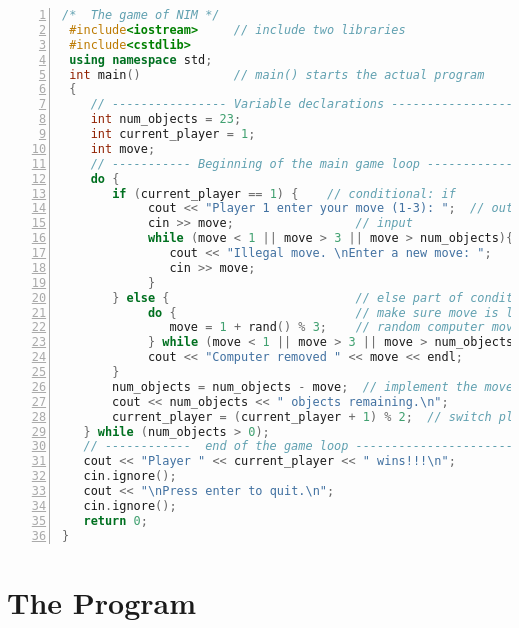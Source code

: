 \begin{minipage}{\textwidth}
\begin{lstlisting}[language=C++,numbers = left, xleftmargin=4.0ex, basicstyle=\small,emph={num_objects,move,current_player},emphstyle = \color{\mycolor},
showstringspaces=false,
caption = {The code for NIM.  When entering this program, do not enter the line numbers.  Keywords are in bold, comments are in italics, and variables are colored maroon.}]
     /*  The game of NIM */
 #include<iostream>     // include two libraries
 #include<cstdlib>
 using namespace std;
 int main()             // main() starts the actual program 
 {
    // ---------------- Variable declarations ---------------------
    int num_objects = 23; 
    int current_player = 1; 
    int move;
    // ----------- Beginning of the main game loop ----------------
    do {                                      
       if (current_player == 1) {    // conditional: if
            cout << "Player 1 enter your move (1-3): ";  // output
            cin >> move;                 // input
            while (move < 1 || move > 3 || move > num_objects){
               cout << "Illegal move. \nEnter a new move: ";
               cin >> move;
            }
       } else {                          // else part of conditional
            do {                         // make sure move is legal
               move = 1 + rand() % 3;    // random computer move
            } while (move < 1 || move > 3 || move > num_objects);
            cout << "Computer removed " << move << endl;
       }
       num_objects = num_objects - move;  // implement the move
       cout << num_objects << " objects remaining.\n";
       current_player = (current_player + 1) % 2;  // switch players
   } while (num_objects > 0);                    
   // ------------  end of the game loop --------------------------
   cout << "Player " << current_player << " wins!!!\n";
   cin.ignore();
   cout << "\nPress enter to quit.\n";
   cin.ignore();
   return 0;
}
\end{lstlisting}\label{listing:NIM1}
\end{minipage}

\section{The Program}

